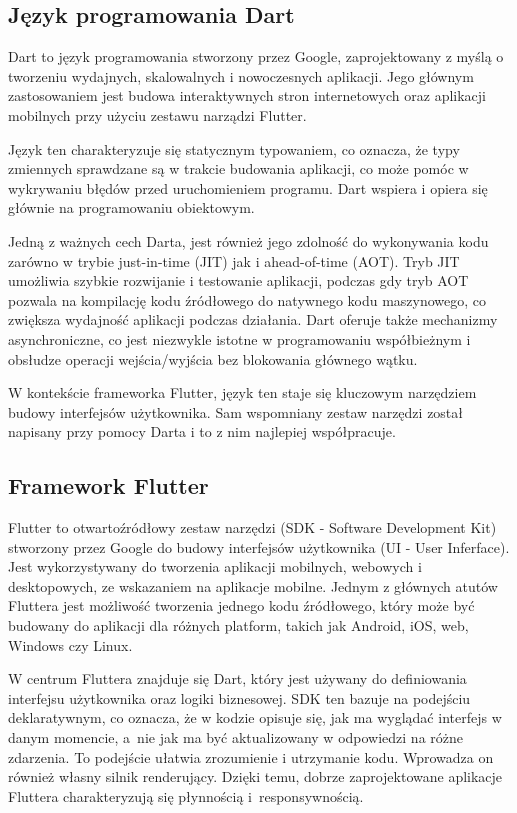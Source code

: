 \documentclass[12pt,twoside]{article}
\begin{document}
\subsection{Język programowania Dart}
Dart to język programowania stworzony przez Google, zaprojektowany z myślą o tworzeniu wydajnych, skalowalnych i nowoczesnych aplikacji. Jego głównym zastosowaniem jest budowa interaktywnych stron internetowych oraz aplikacji mobilnych przy użyciu zestawu narządzi Flutter.

Język ten charakteryzuje się statycznym typowaniem, co oznacza, że typy zmiennych sprawdzane są w trakcie budowania aplikacji, co może pomóc w wykrywaniu błędów przed uruchomieniem programu. Dart wspiera i opiera się głównie na programowaniu obiektowym.

Jedną z ważnych cech Darta, jest również jego zdolność do wykonywania kodu zarówno w trybie just-in-time (JIT) jak i ahead-of-time (AOT). Tryb JIT umożliwia szybkie rozwijanie i testowanie aplikacji, podczas gdy tryb AOT pozwala na kompilację
kodu źródłowego do natywnego kodu maszynowego, co zwiększa wydajność aplikacji podczas działania. Dart oferuje także mechanizmy asynchroniczne, co jest niezwykle istotne w programowaniu współbieżnym i obsłudze operacji wejścia/wyjścia bez blokowania głównego wątku\cite{dartInfo}.

W kontekście frameworka Flutter, język ten staje się kluczowym narzędziem budowy interfejsów użytkownika. Sam wspomniany zestaw narzędzi został napisany przy pomocy Darta i to z nim najlepiej współpracuje.
\subsection{Framework Flutter}
Flutter to otwartoźródłowy zestaw narzędzi (SDK - Software Development Kit) stworzony przez Google do budowy interfejsów użytkownika (UI - User Inferface). Jest wykorzystywany do tworzenia aplikacji mobilnych, webowych i desktopowych, ze wskazaniem na aplikacje mobilne. Jednym z głównych atutów Fluttera jest możliwość tworzenia jednego kodu źródłowego, który może być budowany do aplikacji dla różnych platform, takich jak Android, iOS, web, Windows czy Linux.

W centrum Fluttera znajduje się Dart, który jest używany do definiowania interfejsu użytkownika oraz logiki biznesowej.
SDK ten bazuje na podejściu deklaratywnym, co oznacza, że w kodzie opisuje się, jak ma wyglądać interfejs w danym momencie, a~nie jak ma być aktualizowany w odpowiedzi na różne zdarzenia. To podejście ułatwia zrozumienie i utrzymanie kodu.
Wprowadza on również własny silnik renderujący. Dzięki temu, dobrze zaprojektowane aplikacje Fluttera charakteryzują się płynnością i~responsywnością.
\end{document}
